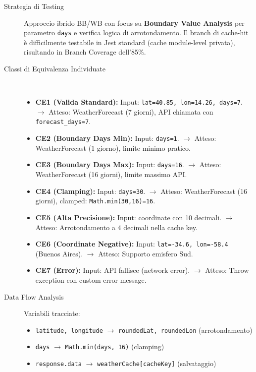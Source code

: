\begin{description}
    \item[Strategia di Testing] Approccio ibrido BB/WB con focus su \textbf{Boundary Value Analysis} per parametro \texttt{days} e verifica logica di arrotondamento. Il branch di cache-hit è difficilmente testabile in Jest standard (cache module-level privata), risultando in Branch Coverage dell'85\%.
    
    \item[Classi di Equivalenza Individuate] ~\\
    \begin{itemize}
        \item \textbf{CE1 (Valida Standard):} Input: \texttt{lat=40.85, lon=14.26, days=7}. $\rightarrow$ Atteso: WeatherForecast (7 giorni), API chiamata con \texttt{forecast\_days=7}.
        \item \textbf{CE2 (Boundary Days Min):} Input: \texttt{days=1}. $\rightarrow$ Atteso: WeatherForecast (1 giorno), limite minimo pratico.
        \item \textbf{CE3 (Boundary Days Max):} Input: \texttt{days=16}. $\rightarrow$ Atteso: WeatherForecast (16 giorni), limite massimo API.
        \item \textbf{CE4 (Clamping):} Input: \texttt{days=30}. $\rightarrow$ Atteso: WeatherForecast (16 giorni), clamped: \texttt{Math.min(30,16)=16}.
        \item \textbf{CE5 (Alta Precisione):} Input: coordinate con 10 decimali. $\rightarrow$ Atteso: Arrotondamento a 4 decimali nella cache key.
        \item \textbf{CE6 (Coordinate Negative):} Input: \texttt{lat=-34.6, lon=-58.4} (Buenos Aires). $\rightarrow$ Atteso: Supporto emisfero Sud.
        \item \textbf{CE7 (Error):} Input: API fallisce (network error). $\rightarrow$ Atteso: Throw exception con custom error message.
    \end{itemize}
    
    \item[Data Flow Analysis] Variabili tracciate:
    \begin{itemize}
        \item \texttt{latitude, longitude} $\rightarrow$ \texttt{roundedLat, roundedLon} (arrotondamento)
        \item \texttt{days} $\rightarrow$ \texttt{Math.min(days, 16)} (clamping)
        \item \texttt{response.data} $\rightarrow$ \texttt{weatherCache[cacheKey]} (salvataggio)
    \end{itemize}
    

\end{description}
